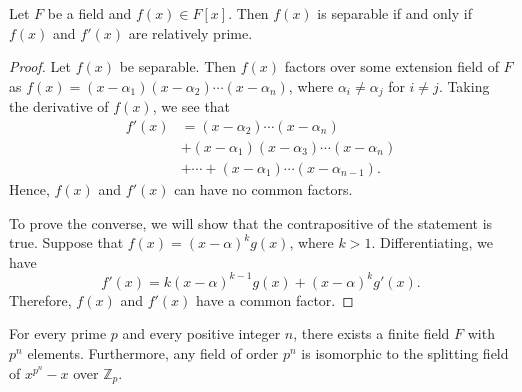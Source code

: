\begin{lemma}\label{finite:separable_derivative_lemma}
Let $F$ be a field and $f(x) \in F[x]$.  Then $f(x)$ is separable if and only if $f(x)$ and $f'(x)$ are relatively prime. 
\end{lemma}


\begin{proof}
Let $f(x)$ be separable.  Then $f(x)$ factors over some extension field of $F$ as $f(x) = (x - \alpha_1) (x - \alpha_2) \cdots (x - \alpha_n)$, where $\alpha_i \neq \alpha_j$ for $i \neq j$. Taking the derivative
of $f(x)$, we see that
\begin{align*}
f'(x) & =  (x - \alpha_2) \cdots (x - \alpha_n) \\
&  +  (x - \alpha_1) (x - \alpha_3) \cdots (x - \alpha_n) \\
&  + \cdots + (x - \alpha_1) \cdots (x - \alpha_{n - 1}).
\end{align*}
Hence, $f(x)$ and $f'(x)$ can have no common factors.

To prove the converse, we will show that the contrapositive of the statement is true.  Suppose that $f(x) = (x - \alpha)^k g(x)$, where $k > 1$.  Differentiating, we have
\[
f'(x) = k ( x - \alpha)^{k-1} g(x) + (x- \alpha)^k g'(x).
\]
Therefore, $f(x)$ and $f'(x)$ have a common factor.
\end{proof}


\begin{theorem}\label{finite:splitting_field_theorem}
For every  prime $p$ and every positive integer $n$, there exists a finite field $F$ with $p^n$ elements. Furthermore, any field of order $p^n$ is isomorphic to the splitting field of $x^{p^n} -x$ over ${\mathbb Z}_p$.
\end{theorem}
 
